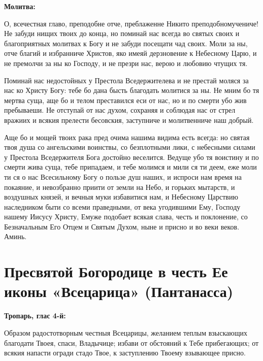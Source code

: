 \medskip


\bfseries Молитва:\normalfont{}\nopagebreak


О, всечестная главо, преподобне отче, преблаженне Никито преподобномучениче! Не забуди нищих твоих до конца, но поминай нас всегда во святых своих и благоприятных молитвах к Богу и не забуди посещати чад своих. Моли за ны, отче благий и избранниче Христов, яко имеяй дерзновение к Небесному Царю, и не премолчи за ны ко Господу, и не презри нас, верою и любовию чтущих тя. 

Поминай нас недостойных у Престола Вседержителева и не престай моляся за нас ко Христу Богу: тебе бо дана бысть благодать молитися за ны. Не мним бо тя мертва суща, аще бо и телом преставился еси от нас, но и по смерти убо жив пребываеши. Не отступай от нас духом, сохраняя и соблюдая нас от стрел вражиих и всякия прелести бесовския, заступниче и молитвенниче наш добрый. 

Аще бо и мощей твоих рака пред очима нашима видима есть всегда: но святая твоя душа со ангельскими воинствы, со безплотными лики, с небесными силами у Престола Вседержителя Бога достойно веселится. Ведуще убо тя воистину и по смерти жива суща, тебе припадаем, и тебе молимся и мили ся ти деем, еже моли ти ся о нас Всесильному Богу о пользе душ наших, и испроси нам время на покаяние, и невозбранно приити от земли на Небо, и горьких мытарств, и воздушных князей, и вечныя муки избавитися нам, и Небесному Царствию наследником быти со всеми праведными, от века угодившими Ему, Господу нашему Иисусу Христу, Емуже подобает всякая слава, честь и поклонение, со Безначальным Его Отцем и Святым Духом, ныне и присно и во веки веков. Аминь.
\mychapterending


 

\section{Пресвятой Богородице в честь Ее иконы «Всецарица» (Пантанасса)}
 


\bfseries Тропарь, глас 4-й:\normalfont{}\nopagebreak


Образом радостотворным честныя Всецарицы, желанием теплым взыскающих благодати Твоея, спаси, Владычице; избави от обстояний к Тебе прибегающих; от всякия напасти огради стадо Твое, к заступлению Твоему взывающее присно.


